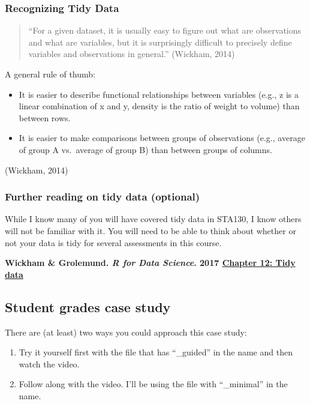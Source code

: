 \documentclass[
  openany]{book}
\providecommand{\tightlist}{%
  \setlength{\itemsep}{0pt}\setlength{\parskip}{0pt}}
\begin{document}
\hypertarget{recognizing-tidy-data}{%
\subsubsection{Recognizing Tidy Data}\label{recognizing-tidy-data}}

\begin{quote}
``For a given dataset, it is usually easy to figure out what are observations and what are variables, but it is surprisingly difficult to precisely define variables and observations in general.'' (Wickham, 2014)
\end{quote}

A general rule of thumb:

\begin{itemize}
\item
  It is easier to describe functional relationships between variables (e.g., z is a linear combination of x and y, density is the ratio of weight to volume) than between rows.
\item
  It is easier to make comparisons between groups of observations (e.g., average of group A vs.~average of group B) than between groups of columns.
\end{itemize}

(Wickham, 2014)

\hypertarget{further-reading-on-tidy-data-optional}{%
\subsubsection{Further reading on tidy data (optional)}\label{further-reading-on-tidy-data-optional}}

While I know many of you will have covered tidy data in STA130, I know others will not be familiar with it. You will need to be able to think about whether or not your data is tidy for several assessments in this course.

\textbf{Wickham \& Grolemund. \emph{R for Data Science}. 2017 \href{https://r4ds.had.co.nz/tidy-data.html}{Chapter 12: Tidy data}}

\hypertarget{student-grades-case-study}{%
\subsection{Student grades case study}\label{student-grades-case-study}}

There are (at least) two ways you could approach this case study:

\begin{enumerate}
\def\labelenumi{\alph{enumi})}
\tightlist
\item
  Try it yourself first with the file that has ``\_guided'' in the name and then watch the video.\\
\item
  Follow along with the video. I'll be using the file with ``\_minimal'' in the name.
\end{enumerate}
\end{document}

